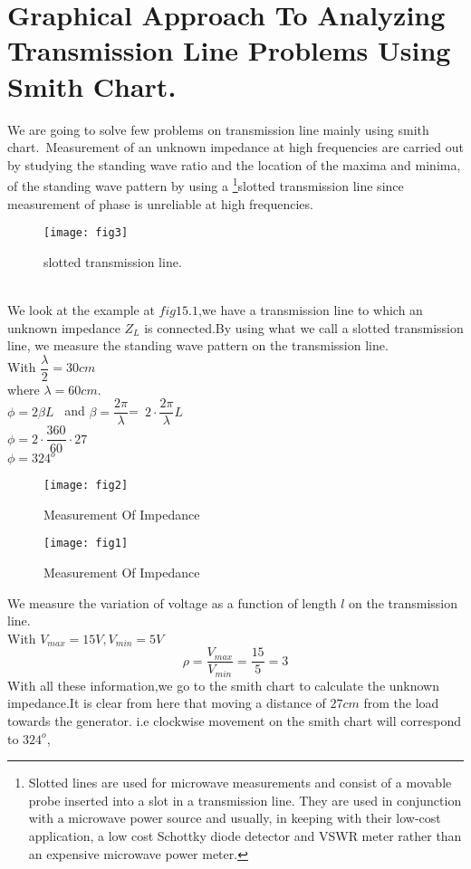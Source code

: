 \chapter{Graphical Approach To Analyzing Transmission Line Problems Using Smith Chart.}
We are going to solve few problems on transmission line mainly using smith chart.\ Measurement of an unknown impedance at high frequencies are carried out by studying the standing wave ratio and the location of the maxima and minima, of the standing wave pattern by using a \footnote{Slotted lines are used for microwave measurements and consist of a movable probe inserted into a slot in a transmission line. They are used in conjunction with a microwave power source and usually, in keeping with their low-cost application, a low cost Schottky diode detector and VSWR meter rather than an expensive microwave power meter.}slotted transmission line since measurement of phase is unreliable at high frequencies.
\begin{figure}[h]
	\centering
	\texttt{[image: fig3]}
	\caption{slotted transmission line.}
\end{figure}
 \\
 We look at the example at $fig15.1$,we have a transmission line to which an unknown impedance $Z_L$ is connected.By using what we call a slotted transmission line, we measure the standing wave pattern on the transmission line.\\
 With $\dfrac{\lambda}{2}=30cm$\\
 where $\lambda=60cm.$\\
 $\phi=2\beta L$ \ and $\beta=\dfrac{2\pi}{\lambda}$=\ $2\cdot\dfrac{2\pi}{\lambda} L$\\
 $\phi=2\cdot\dfrac{360}{60}\cdot27$\\
 $\phi=324^{o}$
  \begin{figure}[h]
  	\centering
  	\texttt{[image: fig2]}
  	\caption{Measurement Of Impedance}
  \end{figure}
\begin{figure}[h]
	\centering
\texttt{[image: fig1]}
	\caption{Measurement Of Impedance}
\end{figure}
We measure the variation of voltage as a function of length $ l $ on the transmission line.\\
With $V_{max}=15V,V_{min}=5V$
 \begin{equation}
 \rho=\frac{V_{max}}{V_{min}}=\frac{15}{5}=3
 \end{equation}
 With all these information,we go to the smith chart to calculate the unknown impedance.It is clear from here that moving a distance of $27cm$ from the load towards the generator. i.e clockwise  movement on the smith chart will correspond to $324^o$,\\
